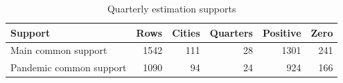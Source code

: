 \begin{table}[htbp]\centering\setlength{\tabcolsep}{4pt}\small
\caption{Quarterly estimation supports}\label{tab:si_dynamic_support}
\begin{tabular}{@{}lrrrrr@{}}\toprule
Support & Rows & Cities & Quarters & Positive & Zero\\\midrule
Main common support & 1542 & 111 & 28 & 1301 & 241\\
Pandemic common support & 1090 & 94 & 24 & 924 & 166\\
\bottomrule\end{tabular}
\end{table}
